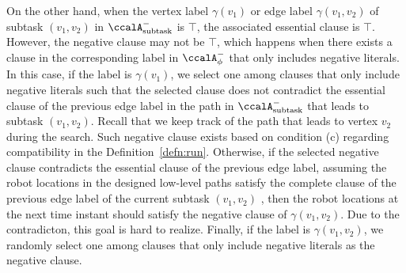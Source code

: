 \documentclass[Afour,sageh,times]{sagej}
\newcommand{\auto}[1]{\ccalA_{\textup{#1}}}
\newcommand{\autop}{\ccalA_{\phi}}
\newcommand{\vertex}[1]{v_{\textup{#1}}}
\begin{document}
{   On the other hand, when the vertex label $\gamma(v_1)$ or edge label $\gamma(v_1, v_2)$ of subtask $(v_1, v_2)$ in $\auto{subtask}^-$ is $\top$, the associated essential clause is $\top$. However, the negative clause may not be $\top$, which happens when there exists a  clause in the corresponding label in $\autop^-$ that only includes negative literals. In this case, if the label is $\gamma(v_1)$, we select one  among clauses that only include negative literals such that the selected clause does not contradict the essential clause of the previous edge label in the path in $\auto{subtask}^-$ that leads to subtask $(v_1, v_2)$. Recall that we keep track of the path that leads to vertex $v_2$ during the search.   Such negative clause exists based on condition (c) regarding compatibility in the Definition~\ref{defn:run}.
   Otherwise, if the selected negative clause contradicts the essential clause of the previous edge label, assuming the robot locations in the designed low-level paths  satisfy the complete clause of the previous edge label of the current subtask $(v_1, v_2)$ , then the robot locations at the next time instant  should satisfy the negative clause of $\gamma(v_1, v_2)$. Due to the contradicton, this goal is hard to realize.  Finally, if the label is $\gamma(v_1, v_2)$, we randomly select  one among clauses that only include negative literals  as the negative clause.}



\end{document}
